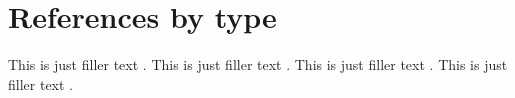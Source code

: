\documentclass[a4paper,oneside]{book}
\begin{document}
\chapter{References by type}

This is just filler text \parencite{knuth:ct:a}.
This is just filler text \parencite{ctan}.
This is just filler text \parencite{companion}.
This is just filler text \parencite{markey}.

\printbibheading
\printbibliography[nottype=online,heading=subbibliography,title={Printed Sources}]
\printbibliography[type=online,heading=subbibliography,title={Online Sources}]
\end{document}
